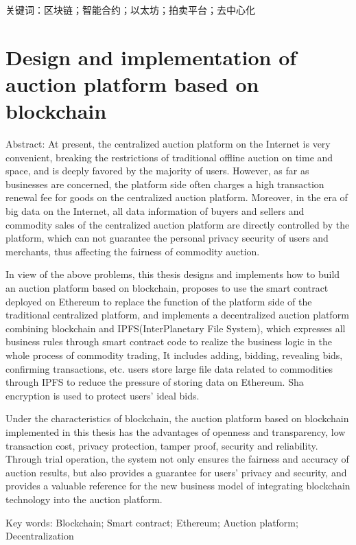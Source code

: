 \documentclass[
  10
]{article}
\begin{document}
关键词：区块链；智能合约；以太坊；拍卖平台；去中心化

\section{Design and implementation of auction platform based on
blockchain}\label{design-and-implementation-of-auction-platform-based-on-blockchain}

Abstract: At present, the centralized auction platform on the Internet
is very convenient, breaking the restrictions of traditional offline
auction on time and space, and is deeply favored by the majority of
users. However, as far as businesses are concerned, the platform side
often charges a high transaction renewal fee for goods on the
centralized auction platform. Moreover, in the era of big data on the
Internet, all data information of buyers and sellers and commodity sales
of the centralized auction platform are directly controlled by the
platform, which can not guarantee the personal privacy security of users
and merchants, thus affecting the fairness of commodity auction.

In view of the above problems, this thesis designs and implements how to
build an auction platform based on blockchain, proposes to use the smart
contract deployed on Ethereum to replace the function of the platform
side of the traditional centralized platform, and implements a
decentralized auction platform combining blockchain and
IPFS(InterPlanetary File System), which expresses all business rules
through smart contract code to realize the business logic in the whole
process of commodity trading, It includes adding, bidding, revealing
bids, confirming transactions, etc. users store large file data related
to commodities through IPFS to reduce the pressure of storing data on
Ethereum. Sha encryption is used to protect users' ideal bids.

Under the characteristics of blockchain, the auction platform based on
blockchain implemented in this thesis has the advantages of openness and
transparency, low transaction cost, privacy protection, tamper proof,
security and reliability. Through trial operation, the system not only
ensures the fairness and accuracy of auction results, but also provides
a guarantee for users' privacy and security, and provides a valuable
reference for the new business model of integrating blockchain
technology into the auction platform.

Key words: Blockchain; Smart contract; Ethereum; Auction platform;
Decentralization
\end{document}
